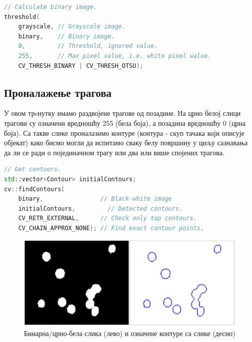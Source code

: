 \documentclass[11pt,a4paper,serbian,oneside]{book}
\begin{document}
 \begin{lstlisting}[language=C++,label=lst:grayscaleOtsu,caption=Рачунање бинарне слике са \textit{Otsu} прагом]
// Calculate binary image.
threshold(
    grayscale, // Grayscale image.
    binary,    // Binary image.
    0,         // Threshold, ignored value.
    255,       // Max pixel value, i.e. white pixel walue.
    CV_THRESH_BINARY | CV_THRESH_OTSU);
\end{lstlisting}

\subsection{Проналажење трагова}

У овом трeнутку имамо раздвојене трагове од позадине. На црно белој слици трагови су означени вредношћу 255 (бела боја), а позадина вредношћу 0 (црна боја). Са такве слике проналазимо контуре (контура - скуп тачака који описује објекат) како бисмо могли да испитамо сваку белу површину у циљу сазнавања да ли се ради о појединачном трагу или два или више спојених трагова. 

 \begin{lstlisting}[language=C++,label=lst:detectContours,caption=Детекција контура трагова]
// Get contuors.
std::vector<Contour> initialContours;
cv::findContours(
    binary,                // Black-white image
    initialContours,	     // Detected contours.
    CV_RETR_EXTERNAL,      // Check only top contours.
    CV_CHAIN_APPROX_NONE); // Find exact contour points.
\end{lstlisting}

\begin{figure}[htb]
\begin{center}
\leavevmode
\includegraphics[width=150mm]{images/seg_bin_con.png}
\end{center}
\caption{Бинарна/црно-бела слика (лево) и означене контуре са слике (десно)}
\label{fig:cv}
\end{figure}
\end{document}
